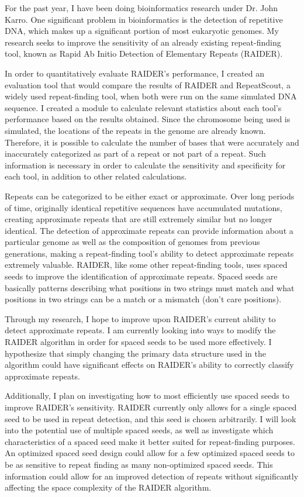 \documentclass[12pt, doublespace]{article}
\begin{document}
\newcommand\COURSE{Charlotte Schaeffer}
\newcommand\HWNUM{Research Overview}             
For the past year, I have been doing bioinformatics research under Dr. John Karro. One significant problem in bioinformatics is the detection of repetitive DNA, which makes up a significant portion of most eukaryotic genomes. My research seeks to improve the sensitivity of an already existing repeat-finding tool, known as Rapid Ab Initio Detection of Elementary Repeats (RAIDER).

In order to quantitatively evaluate RAIDER's performance, I created an evaluation tool that would compare the results of RAIDER and RepeatScout, a widely used repeat-finding tool, when both were run on the same simulated DNA sequence. I created a module to calculate relevant statistics about each tool's performance based on the results obtained. Since the chromosome being used is simulated, the locations of the repeats in the genome are already known. Therefore, it is possible to calculate the number of bases that were accurately and inaccurately categorized as part of a repeat or not part of a repeat. Such information is necessary in order to calculate the sensitivity  and specificity for each tool, in addition to other related calculations.

Repeats can be categorized to be either exact or approximate. Over long periods of time, originally identical repetitive sequences have accumulated mutations, creating approximate repeats that are still extremely similar but no longer identical. The detection of approximate repeats can provide information about a particular genome as well as the composition of genomes from previous generations, making a repeat-finding tool's ability to detect approximate repeats extremely valuable. RAIDER, like some other repeat-finding tools, uses spaced seeds to improve the identification of approximate repeats. Spaced seeds are basically patterns describing what positions in two strings must match and what positions in two strings can be a match or a mismatch (don't care positions). 

Through my research, I hope to improve upon RAIDER's current ability to detect approximate repeats. I am currently looking into ways to modify the RAIDER algorithm in order for spaced seeds to be used more effectively. I hypothesize that simply changing the primary data structure used in the algorithm could have significant effects on RAIDER's ability to correctly classify approximate repeats. 

Additionally, I plan on investigating how to most efficiently use spaced seeds to improve RAIDER's sensitivity. RAIDER currently only allows for a single spaced seed to be used in repeat detection, and this seed is chosen arbitrarily. I will look into the potential use of multiple spaced seeds, as well as investigate which characteristics of a spaced seed make it better suited for repeat-finding purposes. An  optimized spaced seed design could allow for a few optimized spaced seeds to be as sensitive to repeat finding as many non-optimized spaced seeds. This information could allow for an improved detection of repeats without significantly affecting the space complexity of the RAIDER algorithm.
\end{document}
